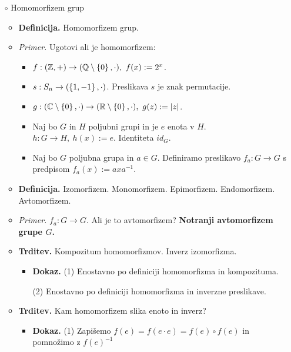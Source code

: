 \begin{enumerate}
    \item[$\circ$] Homomorfizem grup
    \begin{itemize}
        \item \colorbox{purple!30}{\textbf{Definicija.}} Homomorfizem grup.
        \item \colorbox{yellow!30}{\emph{Primer.}}  Ugotovi ali je homomorfizem:
        \begin{itemize}
            \item $f: (\mathbb{Z},+) \to (\mathbb{Q} \setminus \left\{0\right\}, \cdot), \ f(x) := 2^x$.
            \item $s: S_n \to (\left\{1, -1\right\}, \cdot)$. Preslikava $s$ je znak permutacije.                        
            \item $g: (\mathbb{C} \setminus \left\{0\right\}, \cdot) \to (\mathbb{R} \setminus \left\{0\right\}, \cdot), \ g(z) := |z|$.
            \item Naj bo $G$ in $H$ poljubni grupi in je $e$ enota v $H$. $h: G \to H, \ h(x) := e$.
            Identiteta $id_G$.
            \item Naj bo $G$ poljubna grupa in $a \in G$. Definiramo preslikavo $f_a: G \to G$ s predpisom $f_a(x) := axa^{-1}$.
        \end{itemize}
        \item \colorbox{purple!30}{\textbf{Definicija.}} Izomorfizem. Monomorfizem. Epimorfizem. Endomorfizem. Avtomorfizem.
        \item \colorbox{yellow!30}{\emph{Primer.}} $f_a: G \to G$. Ali je to avtomorfizem? \textbf{Notranji avtomorfizem grupe $G$.}
        \item \colorbox{blue!30}{\textbf{Trditev.}} Kompozitum homomorfizmov. Inverz izomorfizma.
        \begin{itemize}
            \item \colorbox{green!30}{\textbf{Dokaz.}} (1) Enostavno po definiciji homomorfizma in kompozituma.
            
            (2) Enostavno po definiciji homomorfizma in inverzne preslikave.
        \end{itemize}
        \item \colorbox{blue!30}{\textbf{Trditev.}} Kam homomorfizem slika enoto in inverz?
        \begin{itemize}
            \item \colorbox{green!30}{\textbf{Dokaz.}} (1) Zapišemo $f(e) = f(e \cdot e) = f(e) \circ f(e)$ in pomnožimo z $f(e)^{-1}$ 
            

\end{itemize}
\end{itemize}
\end{enumerate}
